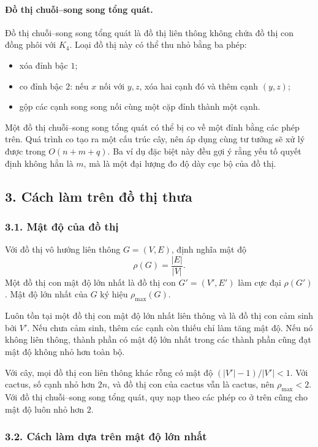 \documentclass[11pt]{article}
\begin{document}
\paragraph{Đồ thị chuỗi--song song tổng quát.}
Đồ thị chuỗi--song song tổng quát là đồ thị liên thông không chứa đồ thị con
đồng phôi với \(K_4\). Loại đồ thị này có thể thu nhỏ bằng ba phép:
\begin{itemize}
  \item xóa đỉnh bậc \(1\);
  \item co đỉnh bậc \(2\): nếu \(x\) nối với \(y,z\), xóa hai cạnh đó và thêm
  cạnh \((y,z)\);
  \item gộp các cạnh song song nối cùng một cặp đỉnh thành một cạnh.
\end{itemize}
Một đồ thị chuỗi--song song tổng quát có thể bị co về một đỉnh bằng các phép
trên. Quá trình co tạo ra một cấu trúc cây, nên áp dụng cùng tư tưởng sẽ xử lý
được trong \(O(n+m+q)\). Ba ví dụ đặc biệt này đều gợi ý rằng yếu tố quyết định
không hẳn là \(m\), mà là một đại lượng đo độ dày cục bộ của đồ thị.

\subsection*{3. Cách làm trên đồ thị thưa}

\subsubsection*{3.1. Mật độ của đồ thị}

Với đồ thị vô hướng liên thông \(G=(V,E)\), định nghĩa mật độ
\[
  \rho(G)=\frac{|E|}{|V|}.
\]
Một đồ thị con mật độ lớn nhất là đồ thị con \(G'=(V',E')\) làm cực đại
\(\rho(G')\). Mật độ lớn nhất của \(G\) ký hiệu \(\rho_{\max}(G)\).

Luôn tồn tại một đồ thị con mật độ lớn nhất liên thông và là đồ thị con cảm
sinh bởi \(V'\). Nếu chưa cảm sinh, thêm các cạnh còn thiếu chỉ làm tăng mật
độ. Nếu nó không liên thông, thành phần có mật độ lớn nhất trong các thành phần
cũng đạt mật độ không nhỏ hơn toàn bộ.

Với cây, mọi đồ thị con liên thông khác rỗng có mật độ
\((|V'|-1)/|V'|<1\). Với cactus, số cạnh nhỏ hơn \(2n\), và đồ thị con của
cactus vẫn là cactus, nên \(\rho_{\max}<2\). Với đồ thị chuỗi--song song tổng
quát, quy nạp theo các phép co ở trên cũng cho mật độ luôn nhỏ hơn \(2\).

\subsubsection*{3.2. Cách làm dựa trên mật độ lớn nhất}
\end{document}
